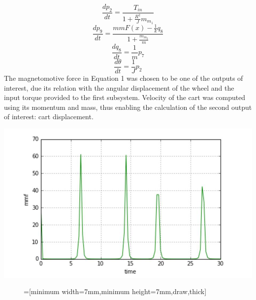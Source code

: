 \documentclass[notitlepage,10pt]{report}
\newenvironment{Figure}
  {\par\medskip\noindent\minipage{\linewidth}}
  {\endminipage\par\medskip}
\begin{document}
\begin{multicols}{2}
\begin{equation}
   \frac{dp_2}{dt} = \frac{T_{in}}{1 + \frac{R^2}{J}m_{m_{1}}}
\end{equation}
\begin{equation}
   \frac{dp_9}{dt} = \frac{mmF(x) - \frac{1}{k}q_8}{1 + \frac{m_{m_{2}}}{m}}
\end{equation}
\begin{equation}
   \frac{dq_8}{dt} = \frac{1}{m}p_7
\end{equation}
\begin{equation}
   \frac{d\theta}{dt} = \frac{1}{J}p_2
\end{equation}
The magnetomotive force in Equation 1 was chosen to be one of the outputs of interest, due its relation with the angular displacement of the wheel and the input torque provided to the first subsystem. Velocity of the cart was computed using its momentum and mass, thus enabling the calculation of the second output of interest: cart displacement.  
\begin{Figure}
 \centering
   \includegraphics[width=\linewidth]{magnetomotive}
   \label{fig:magForce}
\end{Figure}
\begin{figure}
   \centering
   =[minimum width=7mm,minimum height=7mm,draw,thick]
\end{figure}
\end{multicols}
\end{document}
